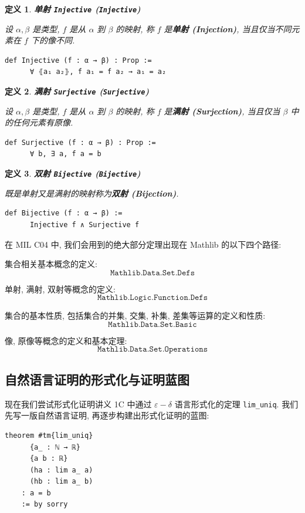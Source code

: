 \documentclass[UTF8]{ctexart}
\DeclareMathOperator{\0}{\mathbf{0}}                    %
\newcommand{\<}{\langle}
\renewcommand{\>}{\rangle}                              %
\newenvironment{dfn_box}{
    \begin{tcolorbox}[enhanced, colback=dfn_green2, boxrule=0pt, frame hidden,
        borderline west={0.7mm}{0.1mm}{dfn_green1},breakable]
    }
    {\end{tcolorbox}}
\theoremstyle{MyStyle} %
\newtheorem{definition}{定义}[subsection]
\newenvironment{dfn}[2]
{
    \begin{dfn_box}
        \begin{definition}
            \textbf{#1
                \ifx\relax#2\relax\else %
                    (#2) %
                \fi}
            \newline
}
{
        \end{definition}
    \end{dfn_box}
}
\begin{document}
        \begin{dfn}
            {单射}
            {\texttt{Injective}}
            设 $\alpha,\beta$ 是类型, $f$ 是从 $\alpha$ 到 $\beta$ 的映射, 称 $f$ 是\textbf{单射 (Injection)}, 当且仅当不同元素在 $f$ 下的像不同. 
            \begin{lstlisting}[style=lean]
    def Injective (f : α → β) : Prop :=
      ∀ ⦃a₁ a₂⦄, f a₁ = f a₂ → a₁ = a₂  
            \end{lstlisting}        
        \end{dfn}

        \begin{dfn}
            {满射}
            {\texttt{Surjective}}
            设 $\alpha,\beta$ 是类型, $f$ 是从 $\alpha$ 到 $\beta$ 的映射, 称 $f$ 是\textbf{满射 (Surjection)}, 当且仅当 $\beta$ 中的任何元素有原像. 
    \begin{lstlisting}[style=lean]
    def Surjective (f : α → β) : Prop :=
      ∀ b, ∃ a, f a = b
    \end{lstlisting}
        \end{dfn}

        \begin{dfn}
            {双射}
            {\texttt{Bijective}}
            既是单射又是满射的映射称为\textbf{双射 (Bijection)}. 
            \begin{lstlisting}[style=lean]
    def Bijective (f : α → β) :=
      Injective f ∧ Surjective f
            \end{lstlisting}
        \end{dfn}

    在 MIL C04 中, 我们会用到的绝大部分定理出现在 Mathlib 的以下四个路径: 

    集合相关基本概念的定义: 
    \[\texttt{Mathlib.Data.Set.Defs}\]

    单射, 满射, 双射等概念的定义: 
    \[\texttt{Mathlib.Logic.Function.Defs}\]

    集合的基本性质, 包括集合的并集, 交集, 补集, 差集等运算的定义和性质: 
    \[\texttt{Mathlib.Data.Set.Basic}\]

    像, 原像等概念的定义和基本定理: 
    \[\texttt{Mathlib.Data.Set.Operations}\]

    \subsection{自然语言证明的形式化与证明蓝图}

        现在我们尝试形式化证明讲义 1C 中通过 $\varepsilon-\delta$ 语言形式化的定理 \texttt{lim\_uniq}. 我们先写一版自然语言证明, 再逐步构建出形式化证明的蓝图: 
        \begin{lstlisting}[style=lean]
    theorem #tm{lim_uniq}
      {a_ : ℕ → ℝ}
      {a b : ℝ}
      (ha : lim a_ a)
      (hb : lim a_ b)
    : a = b
    := by sorry
        \end{lstlisting}
\end{document}
